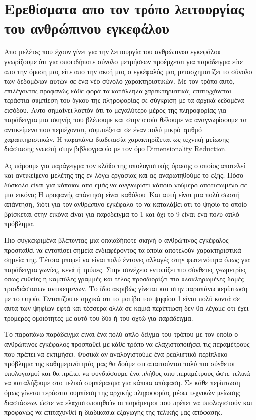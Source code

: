 \section{Ερεθίσματα απο τον τρόπο λειτουργίας του ανθρώπινου εγκεφάλου}
\par
Απο μελέτες που έχουν γίνει για την λειτουργία του ανθρώπινου εγκεφάλου γνωρίζουμε ότι για οποιοδήποτε σύνολο μετρήσεων προέρχεται για παράδειγμα είτε απο την όραση μας είτε απο την ακοή μας ο εγκέφαλός μας μετασχηματίζει το σύνολο των δεδομένων αυτών σε ένα νέο σύνολο χαρακτηριστικών. Με τον τρόπο αυτό, επιλέγοντας προφανώς κάθε φορά τα κατάλληλα χαρακτηριστικά, επιτυγχάνεται τεράστια συμπίεση του όγκου της πληροφορίας σε σύγκριση με τα αρχικά δεδομένα εισόδου. Αυτο σημαίνει λοιπόν ότι το μεγαλύτερο μέρος της πληροφορίας για παράδειγμα μια σκηνής που βλέπουμε και στην οποία θέλουμε να αναγνωρίσουμε τα αντικείμενα που περιέχονται, συμπιέζεται σε έναν πολύ μικρό αριθμό χαρακτηριστικών. Η παραπάνω διαδικασία χαρακτηρίζεται ως τεχνική μείωσης διάστασης γνωστή στην βιβλιογραφία με τον όρο \textlatin{Dimensionality Reduction}.
\par
Ας πάρουμε για παράγειγμα τον κλάδο της υπολογιστικής όρασης ο οποίος αποτελεί και αντικείμενο μελέτης της εν λόγω εργασίας και ας αναρωτηθούμε το εξής: Πόσο δύσκολο είναι για κάποιον απο εμάς να ανγνωρίσει κάποιο νούμερο αποτυπωμένο σε μια εικόνα; Η προφανής απάντηση είναι καθόλου. Και αυτή είναι μια πολύ σωστή απάντηση, διότι για τον ανθρώπινο εγκέφαλο το να καταλάβει οτι το ψηφίο το οποίο βρίσκεται στην εικόνα είναι για παράδειγμα το 1 και όχι το 9 είναι ένα πολύ απλό πρόβλημα. 
\par
Πιο συγκεκριμένα βλέποντας μια οποιαδήποτε σκηνή ο ανθρώπινος εγκέφαλος προσπαθεί να εντοπίσει σημεία ενδιαφέροντος τα οποία αποτελούν χαρακτηριστικά σημεία της. Τέτοια μπορεί να είναι πολύ έντονες αλλαγές στην φωτεινότητα όπως για παράδειγμα γωνίες, κενά ή τρύπες. Στην συνέχεια εντοπίζει πιο σύνθετες γεωμετρίες όπως ευθείες ή καμπύλες γραμμές και τέλος προσδιορίζει πιο ολοκληρωμένες δομές τρισδιάστατων αντικειμένων. Το ίδιο ακριβώς γίνεται και στην παραπάνω περίπτωση με το ψηφίο. Εντοπίζουμε αρχικά οτι το μοτίβο του ψηφίου 1 είναι πολύ κοντά σε αυτά των ψηφίων εφτά και τέσσερα αλλά σε καμιά περίπτωση δεν θα λέγαμε οτι έχει τρομερές ομοιότητες με αυτό του δύο ή του οχτώ για παράδειγμα. 
\par
Το παραπάνω παράδειγμα είναι ένα πολύ απλό δείγμα του τρόπου με τον οποίο ο ανθρώπινος εγκέφαλος προσπαθεί με κάθε τρόπο να ελαχιστοποιήσει τις παραμέτρους που πρέπει να εκτιμήσει. Φυσικά αν αναλογιστούμε ένα ρεαλιστικό περίπλοκο πρόβλημα της καθημερινότητάς μας θα δούμε οτι απαιτούνται πολύ πιο σύνθετοι υπολογισμοί και θα πρέπει να συνδιάσουμε ένα πλήθος απο παραμέτρους ώστε τελικά να καταλήξουμε στο τελικό συμπέρασμα για κάποια απόφαση. Σε κάθε περίπτωση όμως γίνεται τεράστια συμπίεση της αρχικής πληροφορίας μέσω τεχνικών μείωσης διαστάσεων ώστε να ελαχιστοποιηθούν οι παράμετροι που πρέπει να υπολογιστούν και προφανώς να επιταχυνθεί η διαδικασία εξαγωγής της τελικής μας απόφασης.
